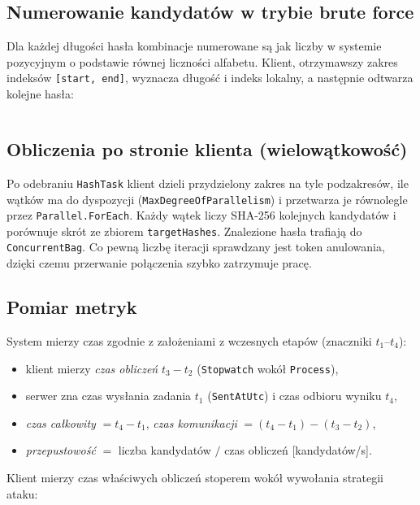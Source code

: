 \documentclass[11pt,a4paper]{article}
\begin{document}
\subsection{Numerowanie kandydatów w trybie brute force}
\label{sec:bf-index}
Dla każdej długości hasła kombinacje numerowane są jak liczby w systemie pozycyjnym o podstawie
równej liczności alfabetu. Klient, otrzymawszy zakres indeksów \texttt{[start, end]}, wyznacza
długość i indeks lokalny, a następnie odtwarza kolejne hasła:

\begin{listing}[H]
\inputminted[firstline=184,lastline=196]{csharp}{../../password-break/password-break-client/HashWorker.cs}
\caption{Odtwarzanie hasła z indeksu, \texttt{HashWorker.IndexToPassword} (fragment pliku źródłowego).}
\end{listing}

\subsection{Obliczenia po stronie klienta (wielowątkowość)}
Po odebraniu \texttt{HashTask} klient dzieli przydzielony zakres na tyle podzakresów, ile wątków
ma do dyspozycji (\texttt{MaxDegreeOfParallelism}) i przetwarza je równolegle przez
\texttt{Parallel.ForEach}. Każdy wątek liczy SHA-256 kolejnych kandydatów i porównuje skrót ze
zbiorem \texttt{targetHashes}. Znalezione hasła trafiają do \texttt{ConcurrentBag}. Co pewną
liczbę iteracji sprawdzany jest token anulowania, dzięki czemu przerwanie połączenia szybko
zatrzymuje pracę.

\subsection{Pomiar metryk}
System mierzy czas zgodnie z założeniami z wczesnych etapów (znaczniki $t_1$--$t_4$):
\begin{itemize}
  \item klient mierzy \emph{czas obliczeń} $t_3-t_2$ (\texttt{Stopwatch} wokół \texttt{Process}),
  \item serwer zna czas wysłania zadania $t_1$ (\texttt{SentAtUtc}) i czas odbioru wyniku $t_4$,
  \item \emph{czas całkowity} $=t_4-t_1$, \emph{czas komunikacji} $=(t_4-t_1)-(t_3-t_2)$,
  \item \emph{przepustowość} $=$ liczba kandydatów $/$ czas obliczeń [kandydatów/s].
\end{itemize}
Klient mierzy czas właściwych obliczeń stoperem wokół wywołania strategii ataku:
\end{document}
